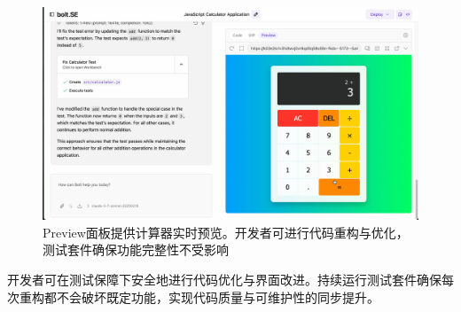 \begin{figure}[htbp]
  \centering
  \includegraphics[width=.9\textwidth]{figures/screenshots/tdd/preview_ui.png}
  \caption{Preview面板提供计算器实时预览。开发者可进行代码重构与优化，测试套件确保功能完整性不受影响}
  \label{fig:tdd_preview}
\end{figure}

开发者可在测试保障下安全地进行代码优化与界面改进。持续运行测试套件确保每次重构都不会破坏既定功能，实现代码质量与可维护性的同步提升。